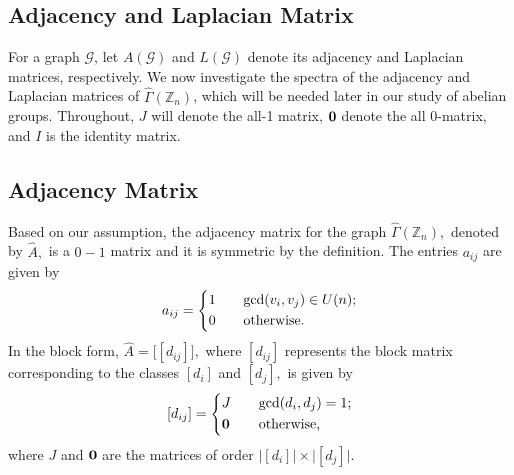 \documentclass[11pt]{article}
\def \Z {{\mathbb Z}}
\def \G {{\mathcal G}}
\begin{document}
\subsection{Adjacency and Laplacian Matrix}
For a graph \(\mathcal{G}\), let \(A(\G)\) and \(L(\G)\) denote its adjacency and Laplacian matrices, respectively. We now investigate the spectra of the adjacency and Laplacian matrices of \(\widehat{\Gamma}(\mathbb{Z}_n)\), which will be needed later in our study of abelian groups. Throughout, $J$ will denote the all-1 matrix, $\bf 0$ denote the all 0-matrix, and $I$ is the identity matrix.

\subsection*{Adjacency Matrix}
Based on our assumption, the adjacency matrix for the graph $\widehat\Gamma(\Z_n),$ denoted by $\widehat A,$ is a $0-1$ matrix and it is symmetric by the definition. The entries $a_{ij}$ are given by
\[a_{ij}=
\begin{dcases}
1&\quad\gcd(v_{i},v_{j})\in U(n);\\
0 &\quad\text{otherwise.}\\
\end{dcases}
\]
In the block form, $\widehat A=\Big[[d_{ij}]\Big],$ where $[d_{ij}]$ represents the block matrix corresponding to the classes $[d_{i}]$ and $[d_{j}],$ is given by 
        \[[d_{ij}]=
        \begin{dcases}
 J&\quad\gcd(d_{i},d_{j})=1;\\
 {\bf 0}&\quad\text{otherwise},\\
        \end{dcases}
        \]
where $J$ and $\bf 0$ are the matrices of order $\Big|[d_{i}]\Big|\times\Big|[d_{j}]\Big|.$ 
\end{document}
